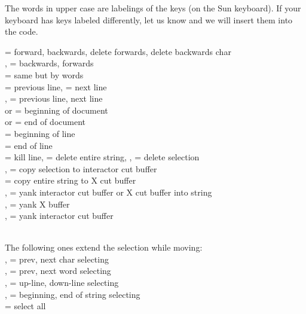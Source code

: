   
The words in upper case are labelings of the keys
(on the Sun keyboard).  If your keyboard has keys labeled differently,
let us know and we will insert them into the code.
\begin{tabular}
     = forward, backwards, delete forwards, delete backwards char\\
    ,  =  backwards, forwards\\
      = same but by words\\
     = previous line,  = next line\\
    ,  = previous line, next line\\
     or  = beginning of document\\
     or  = end of document\\
     = beginning of line\\
     = end of line\\

     = kill line,  = delete entire string, ,  = delete selection\\
    ,  = copy selection to interactor cut buffer\\
     = copy entire string to X cut buffer\\
    ,  = yank interactor cut buffer or X cut buffer into string\\
    ,  = yank X buffer\\
    ,  = yank interactor cut buffer\\

\begin{group}\\
   The following ones extend the selection while moving:\\
       ,  = prev, next char selecting\\
       ,  = prev, next word selecting\\
       ,  = up-line, down-line selecting\\
       ,  = beginning, end of string selecting\\
        = select all\\
\end{group}\\


\end{tabular}
